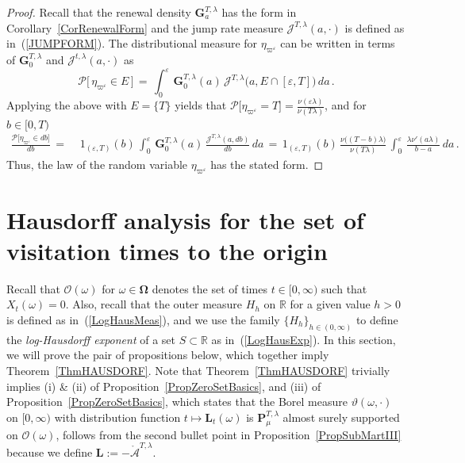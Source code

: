 \documentclass[10pt]{article}
\numberwithin{equation}{section}
\theoremstyle{definition}
\newcommand{\R}{{\mathbb R}}
\begin{document}
 
\begin{proof} Recall that the renewal density $\mathbf{G}^{T,\lambda}_a$ has the form in  Corollary~\ref{CorRenewalForm} and the jump rate measure $\mathscr{J}^{T,\lambda}(a,\cdot)$ is defined as in~(\ref{JUMPFORM}).  The distributional measure for $\eta_{ \varpi^{\varepsilon} }$ can be written in terms of  $\mathbf{G}^{T,\lambda}_0$ and $\mathscr{J}^{t,\lambda}(a,\cdot)$ as 
$$ \mathcal{P}\big[ \,\eta_{ \varpi^{\varepsilon } } \in E \,\big]\,=\,  \int_{0}^{\varepsilon}\,\mathbf{G}^{T,\lambda}_0(a)\,\mathscr{J}^{T,\lambda}\big(a, E\cap [\varepsilon,T] \big)\,da \,.   $$
Applying the above with $E=\{T\}$  yields that $
\mathcal{P}\big[\eta_{ \varpi^{\varepsilon} } = T \big]
= \frac{ \nu(\varepsilon\lambda  )}{ \nu(T\lambda )} 
$,
and for $b\in [0,T)$ 
\begin{align*}
\frac{\mathcal{P}\big[\eta_{ \varpi^{\varepsilon} } \in db\big]}{db}\,=\,& \, 1_{(\varepsilon,T)}(b) \,\int_{0}^{\varepsilon}\,\mathbf{G}^{T,\lambda}_0(a)\,\frac{\mathscr{J}^{T,\lambda}(a,db)}{db}\,da 
\,=\,  1_{ (\varepsilon,T)}(b) \,\frac{ \nu\big((T-b)\lambda \big)}{ \nu(T\lambda )} \,\int_{0}^{\varepsilon} \,\frac{\lambda \nu'(a\lambda )}{b-a}\,da \,.
\end{align*}
Thus, the law of the random variable $\eta_{ \varpi^{\varepsilon} } $ has the stated form. 
\end{proof}





\section{Hausdorff analysis for the set of visitation times to the  origin } \label{SectionHausdorff}
Recall that $\mathscr{O}(\omega)$ for $\omega\in \boldsymbol{\Omega}$  denotes the set of times $t\in [0,\infty)$  such that  $X_t(\omega)=0 $.  Also, recall that the outer measure $H_{h}$ on $\R$ for a given value  $h >0$ is defined as in~(\ref{LogHausMeas}), and we use the family $\{ H_{h}\}_{h\in (0,\infty)}$ to define the \textit{log-Hausdorff exponent} of a set $S\subset \R$ as in~(\ref{LogHausExp}). In this section, we will prove  the pair of propositions below, which together imply Theorem~\ref{ThmHAUSDORF}.  Note that Theorem~\ref{ThmHAUSDORF} trivially implies (i) \& (ii) of Proposition~\ref{PropZeroSetBasics}, and (iii) of Proposition~\ref{PropZeroSetBasics}, which states that   the Borel measure $\vartheta(\omega,\cdot)$ on $[0,\infty)$ with distribution function $t\mapsto \mathbf{L}_t(\omega)$ is  $\mathbf{P}_{\mu}^{T,\lambda}$ almost surely supported on $\mathscr{O}(\omega)$, follows from the second bullet point in Proposition~\ref{PropSubMartIII}  because we define  $\mathbf{L}:=-\mathring{\mathcal{A}}^{T,\lambda}$.
\end{document}
